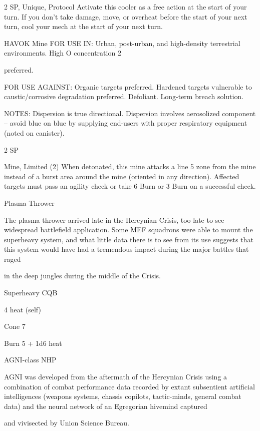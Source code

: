 2 SP, Unique, Protocol  
Activate this cooler as a free action at the start of your turn. If you don’t take damage, move, or  
overheat before the start of your next turn, cool your mech at the start of your next turn.
 

HAVOK Mine  
FOR USE IN: Urban, post-urban, and high-density terrestrial environments. High O   concentration  
                                                                                              2  

preferred.   

FOR USE AGAINST: Organic targets preferred. Hardened targets vulnerable to caustic/corrosive  
degradation preferred. Defoliant. Long-term breach solution.   

NOTES: Dispersion is true directional. Dispersion involves aerosolized component -- avoid blue on blue by  
supplying end-users with proper respiratory equipment (noted on canister).  

2 SP  

Mine, Limited (2)  
When detonated, this mine attacks a line 5 zone from the mine instead of a burst area around the  
mine (oriented in any direction). Affected targets must pass an agility check or take 6 Burn or 3  
Burn on a successful check.
 

Plasma Thrower  

The plasma thrower arrived late in the Hercynian Crisis, too late to see widespread battlefield application.  
Some MEF squadrons were able to mount the superheavy system, and what little data there is to see from  
its use suggests that this system would have had a tremendous impact during the major battles that raged  

in the deep jungles during the middle of the Crisis.   

Superheavy CQB
 
4 heat (self)
 
Cone 7
 
Burn 5 + 1d6 heat
 

AGNI-class NHP  

AGNI was developed from the aftermath of the Hercynian Crisis using a combination of combat  
performance data recorded by extant subsentient artificial intelligences (weapons systems, chassis  
copilots, tactic-minds, general combat data) and the neural network of an Egregorian hivemind captured  

and vivisected by Union Science Bureau.   

                                                                                                                       


